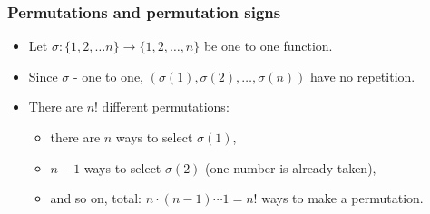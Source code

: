 \begin{frame}
\frametitle{Permutations and permutation signs}
\begin{itemize}
\item Let $\sigma: \{1,2,\dots n\}\to \{1,2,\dots, n\}$ be one to one function.
\item<2-> Since $\sigma $ - one to one, $\left(\sigma(1), \sigma(2), \dots, \sigma(n) \right)$ have no repetition.
\item<4-> There are $n!$ different permutations:
\begin{itemize}
\item<5-> there are $n$ ways to select $\sigma(1)$,
\item<6-> $n-1$ ways to select $\sigma(2)$ (one number is already taken),
\item<7-> and so on,  total: $n \cdot (n-1)\cdots 1 =n!$ ways to make a permutation.
\end{itemize}
\end{itemize}
\end{frame}
